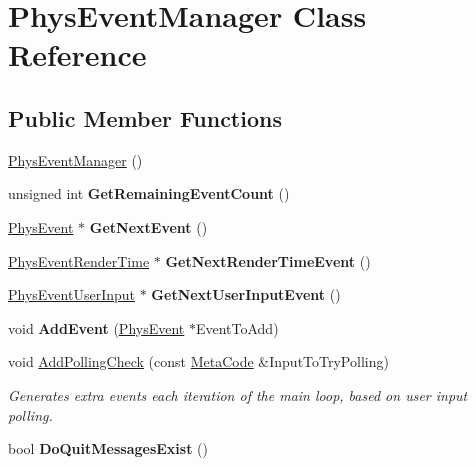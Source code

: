 \hypertarget{classPhysEventManager}{
\section{PhysEventManager Class Reference}
\label{d5/dd7/classPhysEventManager}
}
\subsection*{Public Member Functions}
\begin{DoxyCompactItemize}
\item 
\hyperlink{classPhysEventManager_a217e7f6006aaf5e08e2872fa4d66e5e2}{PhysEventManager} ()
\item 
\hypertarget{classPhysEventManager_ab14d238e7abe9919be8e2d9eef388b64}{
unsigned int {\bfseries GetRemainingEventCount} ()}
\label{d5/dd7/classPhysEventManager_ab14d238e7abe9919be8e2d9eef388b64}

\item 
\hypertarget{classPhysEventManager_a6de94bc6c23dcbd7e15785cadee2e80b}{
\hyperlink{classPhysEvent}{PhysEvent} $\ast$ {\bfseries GetNextEvent} ()}
\label{d5/dd7/classPhysEventManager_a6de94bc6c23dcbd7e15785cadee2e80b}

\item 
\hypertarget{classPhysEventManager_a1f2d0506ce816176913e5bdfaa9fd724}{
\hyperlink{classPhysEventRenderTime}{PhysEventRenderTime} $\ast$ {\bfseries GetNextRenderTimeEvent} ()}
\label{d5/dd7/classPhysEventManager_a1f2d0506ce816176913e5bdfaa9fd724}

\item 
\hypertarget{classPhysEventManager_a4874a9b1138d2351bf28e527a66c02b8}{
\hyperlink{classPhysEventUserInput}{PhysEventUserInput} $\ast$ {\bfseries GetNextUserInputEvent} ()}
\label{d5/dd7/classPhysEventManager_a4874a9b1138d2351bf28e527a66c02b8}

\item 
\hypertarget{classPhysEventManager_a7c9bb46b17f6d9245817a402dc6a2f6f}{
void {\bfseries AddEvent} (\hyperlink{classPhysEvent}{PhysEvent} $\ast$EventToAdd)}
\label{d5/dd7/classPhysEventManager_a7c9bb46b17f6d9245817a402dc6a2f6f}

\item 
void \hyperlink{classPhysEventManager_a1e99385441c5377a741561db581ef3ae}{AddPollingCheck} (const \hyperlink{classMetaCode}{MetaCode} \&InputToTryPolling)
\begin{DoxyCompactList}\small\item\em Generates extra events each iteration of the main loop, based on user input polling. \item\end{DoxyCompactList}\item 
\hypertarget{classPhysEventManager_a77b22f706d22914602982cbcaf05bba9}{
bool {\bfseries DoQuitMessagesExist} ()}
\label{d5/dd7/classPhysEventManager_a77b22f706d22914602982cbcaf05bba9}

\end{DoxyCompactItemize}
